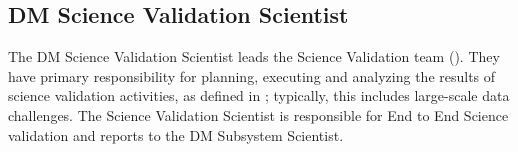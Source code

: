 \subsection{DM Science Validation Scientist}
\label{role:dmsvs}

The DM Science Validation Scientist leads the Science Validation team ().
They have primary responsibility for planning, executing and analyzing the results of science validation activities, as defined in ; typically, this includes large-scale data challenges.
The Science Validation Scientist is responsible for End to End Science validation and reports to the DM Subsystem Scientist.
